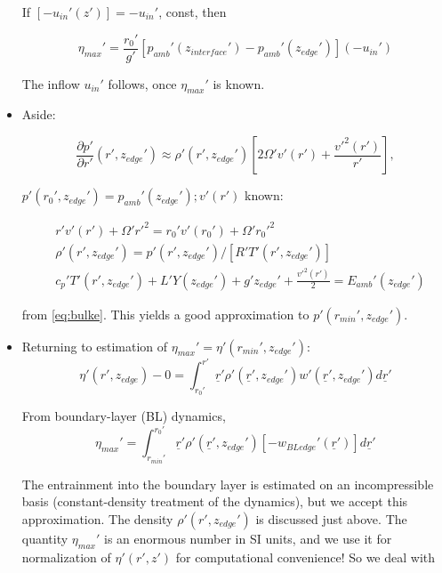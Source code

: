 \documentclass[preprint, prX]{revtex4}
\newcommand{\pd}[2]{\frac{\partial#1}{\partial#2}}
\newcommand{\rmin}{r_{min}}
\newcommand{\zedge}{z_{edge}}
\newcommand{\zinter}{z_{interface}}
\begin{document}
\begin{itemize}
If $[-u_{in}'(z')] = -u_{in}'$, const, then

\begin{equation}
	\eta_{max}' = \frac{r_0'}{g'} \left [ p_{amb}'(\zinter') - p_{amb}'(\zedge')\right ] (-u_{in}')
\end{equation}

The inflow $u_{in}'$ follows, once $\eta_{max}'$ is known.

\item Aside: 

\begin{equation}
	\pd{ p'}{ r'}(r', \zedge') \approx \rho'(r',\zedge') \left [ 2 \Omega' v'(r') + \frac{v'^2(r')}{r'} \right ], 
	\label{eq:bulkdpdr}
\end{equation}
\begin{center}
$p'(r_0', \zedge') = p_{amb}'(\zedge'); v'(r')$ known:
\label{eq:bulkdpdz}
\end{center}
\begin{equation}
\begin{split}
	&r'v'(r') + \Omega' r'^2 = r_0' v'(r_0') + \Omega' r_0'^2 \\
	&\rho'(r', \zedge') = p'(r',\zedge') /[R' T'(r',\zedge')]\\
	&c_p' T'(r',\zedge') + L'Y(\zedge') + g'\zedge' + \frac{v'^2(r')}{2} = E_{amb}'(\zedge')
\end{split}
\label{eq:bulkpvknown}
\end{equation}

from \eqref{eq:bulke}. This yields a good approximation to $p'(\rmin', \zedge')$.

\item Returning to estimation of $\eta_{max}' = \eta'(\rmin', \zedge')$:
\begin{equation}
	\eta'(r',\zedge) - 0 = \int_{r_0'}^{r'} \underline{r}' \rho'(\underline{r}', \zedge') w'(\underline{r}', \zedge') d\underline{r}'
\end{equation}

From boundary-layer (BL) dynamics,
\begin{equation}
	\eta_{max}' = \int_{\rmin'}^{r_0'} \underline{r}' \rho'(\underline{r}', \zedge')\left [ -w_{BL edge}'(\underline{r}')\right ] d\underline{r}'
\end{equation}

The entrainment into the boundary layer is estimated on an incompressible basis (constant-density treatment of the dynamics), but we accept this approximation. The density $\rho'(r',\zedge')$ is discussed just above. The quantity $\eta_{max}'$ is an enormous number in SI units, and we use it for normalization of $\eta'(r',z')$ for computational convenience! So we deal with 


\end{itemize}
\end{document}

